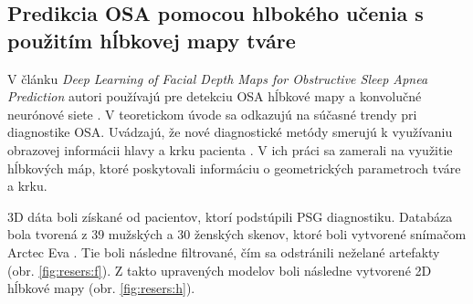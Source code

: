 \subsection{Predikcia OSA pomocou hlbokého učenia s použitím hĺbkovej mapy tváre}

V článku \textit{Deep Learning of Facial Depth Maps for Obstructive Sleep Apnea Prediction} autori používajú pre detekciu OSA hĺbkové mapy a konvolučné neurónové siete \cite{Islam}. V teoretickom úvode sa odkazujú na súčasné trendy pri diagnostike OSA. Uvádzajú, že nové diagnostické metódy smerujú k využívaniu obrazovej informácii hlavy a krku pacienta \cite{lee2009craniofacial,pae1999shape,lee2009prediction}. V ich práci sa zamerali na využitie hĺbkových máp, ktoré poskytovali informáciu o geometrických parametroch tváre a krku. 

3D dáta boli získané od pacientov, ktorí podstúpili PSG diagnostiku. Databáza bola tvorená z 39 mužských a 30 ženských skenov, ktoré boli vytvorené snímačom Arctec Eva \cite{artec}. Tie boli následne filtrované, čím sa odstránili neželané artefakty (obr. \ref{fig:resers:f}). Z takto upravených modelov boli následne vytvorené 2D hĺbkové mapy (obr. \ref{fig:resers:h}).  

